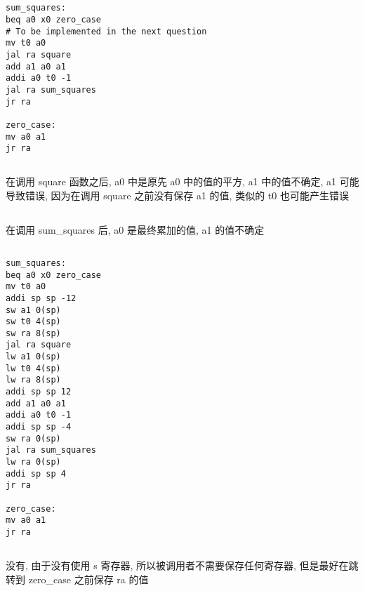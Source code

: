 \documentclass[UTF8,nofonts]{ctexart}
\begin{document}
\subsection{}
\begin{verbatim}
sum_squares:
beq a0 x0 zero_case
# To be implemented in the next question
mv t0 a0
jal ra square
add a1 a0 a1
addi a0 t0 -1
jal ra sum_squares
jr ra

zero_case:
mv a0 a1
jr ra
\end{verbatim}

\subsection{}
在调用 square 函数之后, a0 中是原先 a0 中的值的平方, a1 中的值不确定, a1 可能导致错误, 因为在调用 square 之前没有保存 a1 的值, 类似的 t0 也可能产生错误

\subsection{}
在调用 sum\_squares 后, a0 是最终累加的值, a1 的值不确定

\subsection{}
\begin{verbatim}
sum_squares:
beq a0 x0 zero_case
mv t0 a0
addi sp sp -12
sw a1 0(sp)
sw t0 4(sp)
sw ra 8(sp)
jal ra square
lw a1 0(sp)
lw t0 4(sp)
lw ra 8(sp)
addi sp sp 12
add a1 a0 a1
addi a0 t0 -1
addi sp sp -4
sw ra 0(sp)
jal ra sum_squares
lw ra 0(sp)
addi sp sp 4
jr ra

zero_case:
mv a0 a1
jr ra
\end{verbatim}

\subsection{}
没有, 由于没有使用 s 寄存器, 所以被调用者不需要保存任何寄存器, 但是最好在跳转到 zero\_case 之前保存 ra 的值
\end{document}
